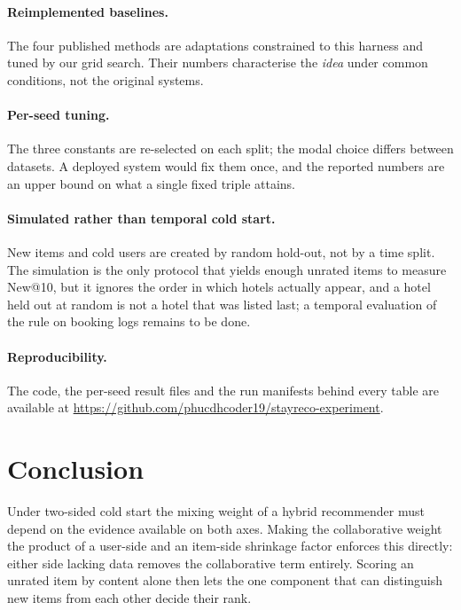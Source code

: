 \documentclass[runningheads]{llncs}
\begin{document}
\paragraph{Reimplemented baselines.} The four published methods are adaptations constrained to this harness and tuned by our grid search. Their numbers characterise the \emph{idea} under common conditions, not the original systems.

\paragraph{Per-seed tuning.} The three constants are re-selected on each split; the modal choice differs between datasets. A deployed system would fix them once, and the reported numbers are an upper bound on what a single fixed triple attains.

\paragraph{Simulated rather than temporal cold start.} New items and cold users are created by random hold-out, not by a time split. The simulation is the only protocol that yields enough unrated items to measure New@10, but it ignores the order in which hotels actually appear, and a hotel held out at random is not a hotel that was listed last; a temporal evaluation of the rule on booking logs remains to be done.

\paragraph{Reproducibility.} The code, the per-seed result files and the run manifests behind every table are available at \url{https://github.com/phucdhcoder19/stayreco-experiment}.

\section{Conclusion}

Under two-sided cold start the mixing weight of a hybrid recommender must depend on the evidence available on both axes. Making the collaborative weight the product of a user-side and an item-side shrinkage factor enforces this directly: either side lacking data removes the collaborative term entirely. Scoring an unrated item by content alone then lets the one component that can distinguish new items from each other decide their rank.
\end{document}
